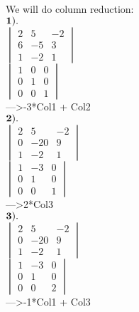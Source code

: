 \documentclass[]{article}
\begin{document}
We will do column reduction:\\

\(\bold{1).}\)\\

\(\begin{vmatrix} 2 & 5 & -2\\ 6 & -5 & 3 \\ 1 & -2 & 1 \end{vmatrix}\)\\

\(\begin{vmatrix} 1 & 0 & 0\\ 0 & 1 & 0 \\ 0 & 0 & 1 \end{vmatrix}\)\\

---\textgreater{}-3*Col1 + Col2\\

\(\bold{2).}\)\\

\(\begin{vmatrix} 2 & 5 & -2\\ 0 & -20 & 9 \\ 1 & -2 & 1 \end{vmatrix}\)\\

\(\begin{vmatrix} 1 & -3 & 0\\ 0 & 1 & 0 \\ 0 & 0 & 1 \end{vmatrix}\)\\

---\textgreater{}2*Col3\\

\(\bold{3).}\)\\

\(\begin{vmatrix} 2 & 5 & -2\\ 0 & -20 & 9 \\ 1 & -2 & 1 \end{vmatrix}\)\\

\(\begin{vmatrix} 1 & -3 & 0\\ 0 & 1 & 0 \\ 0 & 0 & 2 \end{vmatrix}\)\\

---\textgreater{}-1*Col1 + Col3\\
\end{document}
